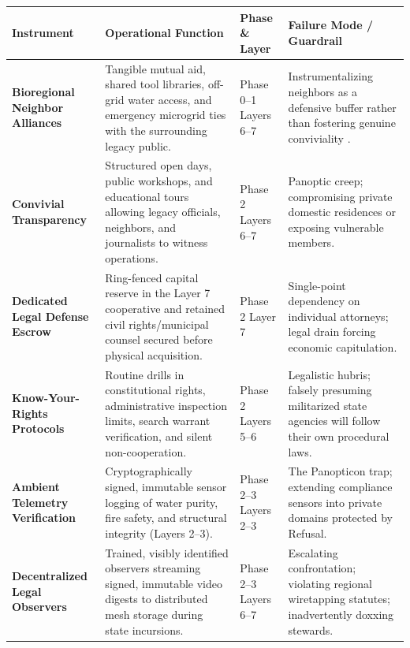 \begin{table}[htbp]
\centering
\footnotesize
\setlength{\tabcolsep}{4pt}
\begin{tabular}{|p{}|p{}|p{}|p{}|}
\hline
\textbf{Instrument} & \textbf{Operational Function} & \textbf{Phase \& Layer} & \textbf{Failure Mode / Guardrail} \\
\hline
\textbf{Bioregional Neighbor Alliances} & Tangible mutual aid, shared tool libraries, off-grid water access, and emergency microgrid ties with the surrounding legacy public. & Phase 0--1 \newline Layers 6--7 & Instrumentalizing neighbors as a defensive buffer rather than fostering genuine conviviality \parencite{illich1973}. \\
\hline
\textbf{Convivial Transparency} & Structured open days, public workshops, and educational tours allowing legacy officials, neighbors, and journalists to witness operations. & Phase 2 \newline Layers 6--7 & Panoptic creep; compromising private domestic residences or exposing vulnerable members. \\
\hline
\textbf{Dedicated Legal Defense Escrow} & Ring-fenced capital reserve in the Layer 7 cooperative and retained civil rights/municipal counsel secured before physical acquisition. & Phase 2 \newline Layer 7 & Single-point dependency on individual attorneys; legal drain forcing economic capitulation. \\
\hline
\textbf{Know-Your-Rights Protocols} & Routine drills in constitutional rights, administrative inspection limits, search warrant verification, and silent non-cooperation. & Phase 2 \newline Layers 5--6 & Legalistic hubris; falsely presuming militarized state agencies will follow their own procedural laws. \\
\hline
\textbf{Ambient Telemetry Verification} & Cryptographically signed, immutable sensor logging of water purity, fire safety, and structural integrity (Layers 2--3). & Phase 2--3 \newline Layers 2--3 & The Panopticon trap; extending compliance sensors into private domains protected by Refusal. \\
\hline
\textbf{Decentralized Legal Observers} & Trained, visibly identified observers streaming signed, immutable video digests to distributed mesh storage during state incursions. & Phase 2--3 \newline Layers 6--7 & Escalating confrontation; violating regional wiretapping statutes; inadvertently doxxing stewards. \\

\end{tabular}
\end{table}
